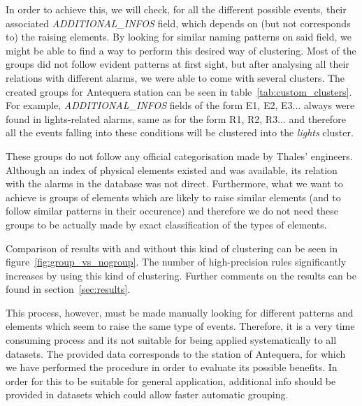 \documentclass[a4paper,12pt]{article}
\begin{document}
In order to achieve this, we will check, for all the different possible events, their associated \emph{ADDITIONAL\_INFOS} field, which depends on (but not corresponds to) the raising elements. By looking for similar naming patterns on said field, we might be able to find a way to perform this desired way of clustering. Most of the groups did not follow evident patterns at first sight, but after analysing all their relations with different alarms, we were able to come with several clusters. The created groups for Antequera station can be seen in table~\ref{tab:custom_clusters}. For example, \emph{ADDITIONAL\_INFOS} fields of the form E1, E2, E3... always were found in lights-related alarms, same as for the form R1, R2, R3... and therefore all the events falling into these conditions will be clustered into the \emph{lights} cluster.

These groups do not follow any official categorisation made by Thales' engineers. Although an index of physical elements existed and was available, its relation with the alarms in the database was not direct. Furthermore, what we want to achieve is groups of elements which are likely to raise similar elements (and to follow similar patterns in their occurence) and therefore we do not need these groups to be actually made by exact classification of the types of elements.

Comparison of results with and without this kind of clustering can be seen in figure~\ref{fig:group_vs_nogroup}. The number of high-precision rules significantly increases by using this kind of clustering. Further comments on the results can be found in section~\ref{sec:results}.

This process, however, must be made manually looking for different patterns and elements which seem to raise the same type of events. Therefore, it is a very time consuming process and its not suitable for being applied systematically to all datasets. The provided data corresponds to the station of Antequera, for which we have performed the procedure in order to evaluate its possible benefits. In order for this to be suitable for general application, additional info should be provided in datasets which could allow faster automatic grouping.
\end{document}

